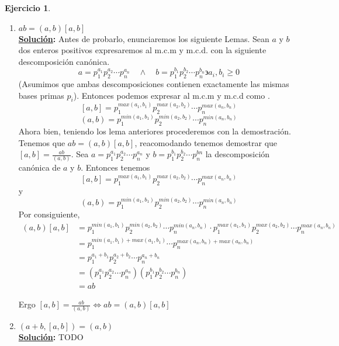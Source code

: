\documentclass[11pt,letterpaper]{article}
\theoremstyle{definition}\newtheorem{p}{Ejercicio}
\theoremstyle{definition}\newtheorem{pp}[p]{$(*)$Ejercicio}
\numberwithin{p}{section}
\newcommand{\sol}{\textbf{\underline{Solución}: }} %
\begin{document}
\begin{p}
\begin{enumerate}
  \item $ab=(a,b)[a,b]$\\
  \sol Antes de probarlo, enunciaremos los siguiente Lemas. Sean $a$ y $b$ dos enteros positivos  
  expresaremos al m.c.m y m.c.d. con la siguiente descomposición canónica.
  $$a=p_{1}^{a_1}p_{2}^{a_2} \cdots p_{n}^{a_n} \quad \land  \quad b=p_{1}^{b_1}p_{2}^{b_2} \cdots p_{n}^{b_n} \backepsilon a_i,b_i \geq 0$$
  (Asumimos que ambas descomposiciones contienen exactamente las mismas bases primas $p_i$). 
  Entonces podemos expresar al m.c.m y m.c.d como .
  $$[a,b] =p_{1}^{max(a_1,b_1)}p_{2}^{max(a_2,b_2)} \cdots p_{n}^{max(a_n,b_n)}$$
  $$(a,b) =p_{1}^{min(a_1,b_1)}p_{2}^{min(a_2,b_2)} \cdots p_{n}^{min(a_n,b_n)}$$
  Ahora bien, teniendo los lema anteriores procederemos con la demostración.\\
  Tenemos que $ab=(a,b)[a,b]$, reacomodando tenemos demostrar que $[a,b]=\frac{ab}{(a,b)}$.
  Sea $a=p_{1}^{a_1}p_{2}^{a_2} \cdots p_{n}^{a_n}$ y $b=p_{1}^{b_1}p_{2}^{b_2} \cdots p_{n}^{bn}$ 
  la descomposición canónica de $a$ y $b$. Entonces tenemos
  $$[a,b] = p_{1}^{max(a_1,b_1)}p_{2}^{max(a_2,b_2)} \cdots p_{n}^{max(a_n,b_n)}$$
  y
  $$(a,b) = p_{1}^{min(a_1,b_1)}p_{2}^{min(a_2,b_2)} \cdots p_{n}^{min(a_n,b_n)}$$
  Por consiguiente,
  \begin{align*}
  (a,b)[a,b]
    &= p_{1}^{min(a_1,b_1)}p_{2}^{min(a_2,b_2)} \cdots p_{n}^{min(a_n,b_n)} \cdot p_{1}^{max(a_1,b_1)}p_{2}^{max(a_2,b_2)} \cdots p_{n}^{max(a_n,b_n)} \\
    &= p_{1}^{min(a_1,b_1)+max(a_1,b_1)} \cdots p_{n}^{max(a_n,b_n)+max(a_n,b_n)} \\
    &= p_{1}^{a_1 + b_1}p_{2}^{a_2 + b_2} \cdots p_{n}^{a_n + b_n} \\
    &= (p_{1}^{a_1}p_{2}^{a_2} \cdots p_{n}^{a_n})(p_{1}^{b_1}p_{2}^{b_2} \cdots p_{n}^{b_n}) \\
    &= ab
  \end{align*}

  Ergo $[a,b]=\frac{ab}{(a,b)}  \iff ab=(a,b)[a,b]$  
  
  \item $(a+b,[a,b])=(a,b)$\\
  \sol TODO
  
  \end{enumerate}
\end{p}
%
\end{document}
